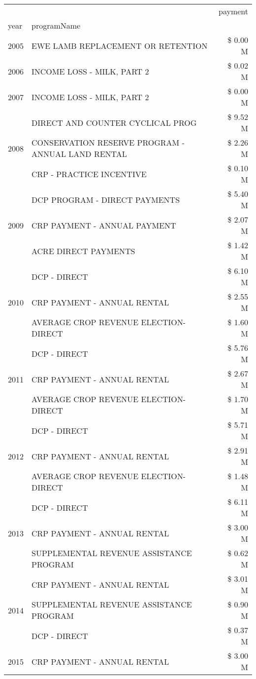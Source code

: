 \begin{tabular}{llr}
\toprule
 &  & payment \\
year & programName &  \\
\midrule
2005 & EWE LAMB REPLACEMENT OR RETENTION & \$ 0.00 M \\
\cline{1-3}
2006 & INCOME LOSS - MILK, PART 2 & \$ 0.02 M \\
\cline{1-3}
2007 & INCOME LOSS - MILK, PART 2 & \$ 0.00 M \\
\cline{1-3}
\multirow[t]{3}{*}{2008} & DIRECT AND COUNTER CYCLICAL PROG & \$ 9.52 M \\
 & CONSERVATION RESERVE PROGRAM - ANNUAL LAND RENTAL & \$ 2.26 M \\
 & CRP - PRACTICE INCENTIVE & \$ 0.10 M \\
\cline{1-3}
\multirow[t]{3}{*}{2009} & DCP PROGRAM - DIRECT PAYMENTS & \$ 5.40 M \\
 & CRP PAYMENT - ANNUAL PAYMENT & \$ 2.07 M \\
 & ACRE DIRECT PAYMENTS & \$ 1.42 M \\
\cline{1-3}
\multirow[t]{3}{*}{2010} & DCP - DIRECT & \$ 6.10 M \\
 & CRP PAYMENT - ANNUAL RENTAL & \$ 2.55 M \\
 & AVERAGE CROP REVENUE ELECTION-DIRECT & \$ 1.60 M \\
\cline{1-3}
\multirow[t]{3}{*}{2011} & DCP - DIRECT & \$ 5.76 M \\
 & CRP PAYMENT - ANNUAL RENTAL & \$ 2.67 M \\
 & AVERAGE CROP REVENUE ELECTION-DIRECT & \$ 1.70 M \\
\cline{1-3}
\multirow[t]{3}{*}{2012} & DCP - DIRECT & \$ 5.71 M \\
 & CRP PAYMENT - ANNUAL RENTAL & \$ 2.91 M \\
 & AVERAGE CROP REVENUE ELECTION-DIRECT & \$ 1.48 M \\
\cline{1-3}
\multirow[t]{3}{*}{2013} & DCP - DIRECT & \$ 6.11 M \\
 & CRP PAYMENT - ANNUAL RENTAL & \$ 3.00 M \\
 & SUPPLEMENTAL REVENUE ASSISTANCE PROGRAM & \$ 0.62 M \\
\cline{1-3}
\multirow[t]{3}{*}{2014} & CRP PAYMENT - ANNUAL RENTAL & \$ 3.01 M \\
 & SUPPLEMENTAL REVENUE ASSISTANCE PROGRAM & \$ 0.90 M \\
 & DCP - DIRECT & \$ 0.37 M \\
\cline{1-3}
\multirow[t]{3}{*}{2015} & CRP PAYMENT - ANNUAL RENTAL & \$ 3.00 M \\

\end{tabular}
